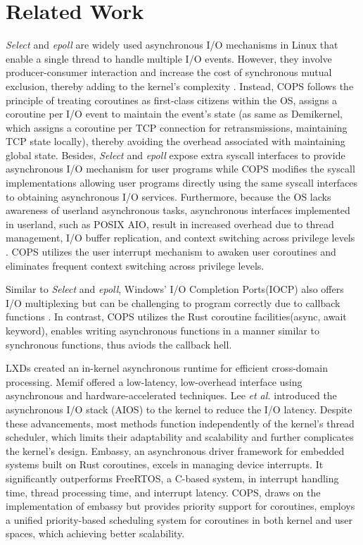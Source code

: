 \documentclass[conference]{IEEEtran}
\begin{document}
\section{Related Work}
\label{section: Related Work}

\textit{Select} and \textit{epoll} are widely used asynchronous I/O mechanisms in Linux that enable a single thread to handle multiple I/O events. However, they involve producer-consumer interaction and increase the cost of synchronous mutual exclusion, thereby adding to the kernel's complexity \cite{Gammo2004ComparingAE}. Instead, COPS follows the principle of treating coroutines as first-class citizens within the OS, assigns a coroutine per I/O event to maintain the event's state (as same as Demikernel\cite{zhang_demikernel_2021}, which assigns a coroutine per TCP connection for retransmissions, maintaining TCP state locally), thereby avoiding the overhead associated with maintaining global state. Besides, \textit{Select} and \textit{epoll} expose extra syscall interfaces to provide asynchronous I/O mechanism for user programs while COPS modifies the syscall implementations allowing user programs directly using the same syscall interfaces to obtaining asynchronous I/O services. Furthermore, because the OS lacks awareness of userland asynchronous tasks, asynchronous interfaces implemented in userland, such as POSIX AIO, result in increased overhead due to thread management, I/O buffer replication, and context switching across privilege levels \cite{jones2006boost}. COPS utilizes the user interrupt mechanism to awaken user coroutines and eliminates frequent context switching across privilege levels. 

Similar to \textit{Select} and \textit{epoll}, Windows' I/O Completion Ports(IOCP) \cite{alvinashcraft_io_2022} also offers I/O multiplexing but can be challenging to program correctly due to callback functions \cite{callbackhell}. In contrast, COPS utilizes the Rust coroutine facilities(async, await keyword), enables writing asynchronous functions in a manner similar to synchronous functions, thus aviods the callback hell.

LXDs \cite{narayanan2019lxds} created an in-kernel asynchronous runtime for efficient cross-domain processing. Memif \cite{lin2016memif} offered a low-latency, low-overhead interface using asynchronous and hardware-accelerated techniques. Lee \textit{et al.} \cite{lee2019asynchronous} introduced the asynchronous I/O stack (AIOS) to the kernel to reduce the I/O latency. Despite these advancements, most methods function independently of the kernel's thread scheduler, which limits their adaptability and scalability and further complicates the kernel's design. Embassy\cite{embassy}, an asynchronous driver framework for embedded systems built on Rust coroutines, excels in managing device interrupts. It significantly outperforms FreeRTOS, a C-based system, in interrupt handling time, thread processing time, and interrupt latency. COPS, draws on the implementation of embassy but provides priority support for coroutines, employs a unified priority-based scheduling system for coroutines in both kernel and user spaces, which achieving better scalability.
\end{document}
